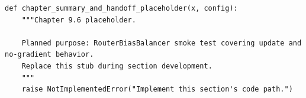 \begin{lstlisting}[style=bookpython,caption={Planned code placeholder for chapter summary and handoff.},label={lst:ch09-chapter-summary-and-handoff}]
def chapter_summary_and_handoff_placeholder(x, config):
    """Chapter 9.6 placeholder.

    Planned purpose: RouterBiasBalancer smoke test covering update and no-gradient behavior.
    Replace this stub during section development.
    """
    raise NotImplementedError("Implement this section's code path.")
\end{lstlisting}
